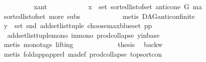 \begin{isabellebody}
\isanewline
\ \ \ \ \ \ \ \ \isamarkupfalse%
\ x{\isacharunderscore}{\kern0pt}ant\isanewline
\ \ \ \ \ \ \ \ \isamarkupfalse%
\ \isamarkupfalse%
\ {\isachardoublequoteopen}x\ {\isasymin}\ set\ {\isacharparenleft}{\kern0pt}sorted{\isacharunderscore}{\kern0pt}list{\isacharunderscore}{\kern0pt}of{\isacharunderscore}{\kern0pt}set\ {\isacharparenleft}{\kern0pt}anticone\ G\ ma{\isacharparenright}{\kern0pt}{\isacharparenright}{\kern0pt}{\isachardoublequoteclose}\ \isanewline
\ \ \ \ \ \ \ \ \ \ \isamarkupfalse%
\ sorted{\isacharunderscore}{\kern0pt}list{\isacharunderscore}{\kern0pt}of{\isacharunderscore}{\kern0pt}set{\isacharparenleft}{\kern0pt}{}{\isacharparenright}{\kern0pt}\ more\ subs\isanewline
\ \ \ \ \ \ \ \ \ \ \isamarkupfalse%
\ {\isacharparenleft}{\kern0pt}metis\ DAG{\isachardot}{\kern0pt}anticon{\isacharunderscore}{\kern0pt}finite{\isacharparenright}{\kern0pt}\ \isanewline
\ \ \ \ \ \ \ \ \isamarkupfalse%
\ \isamarkupfalse%
\ {\isachardoublequoteopen}y\ {\isasymin}\ set\ {\isacharparenleft}{\kern0pt}snd\ {\isacharparenleft}{\kern0pt}add{\isacharunderscore}{\kern0pt}set{\isacharunderscore}{\kern0pt}list{\isacharunderscore}{\kern0pt}tuple\ {\isacharparenleft}{\kern0pt}choose{\isacharunderscore}{\kern0pt}max{\isacharunderscore}{\kern0pt}blue{\isacharunderscore}{\kern0pt}set\ pp{\isacharparenright}{\kern0pt}{\isacharparenright}{\kern0pt}{\isacharparenright}{\kern0pt}{\isachardoublequoteclose}\isanewline
\ \ \ \ \ \ \ \ \ \ \isamarkupfalse%
\ \ add{\isacharunderscore}{\kern0pt}set{\isacharunderscore}{\kern0pt}list{\isacharunderscore}{\kern0pt}tuple{\isacharunderscore}{\kern0pt}mono\ in{\isacharunderscore}{\kern0pt}mono\ prod{\isachardot}{\kern0pt}collapse\ y{\isacharunderscore}{\kern0pt}in{\isacharunderscore}{\kern0pt}base\isanewline
\ \ \ \ \ \ \ \ \ \ \isamarkupfalse%
\ {\isacharparenleft}{\kern0pt}metis\ {\isacharparenleft}{\kern0pt}mono{\isacharunderscore}{\kern0pt}tags{\isacharcomma}{\kern0pt}\ lifting{\isacharparenright}{\kern0pt}{\isacharparenright}{\kern0pt}\ \isanewline
\ \ \ \ \ \ \ \ \isamarkupfalse%
\ \isamarkupfalse%
\ {\isacharquery}{\kern0pt}thesis\ \isamarkupfalse%
\ backw\isanewline
\ \ \ \ \ \ \ \ \ \ \isamarkupfalse%
\ {\isacharparenleft}{\kern0pt}metis\ fold{\isacharunderscore}{\kern0pt}app{\isacharunderscore}{\kern0pt}app{\isacharunderscore}{\kern0pt}rel\ ma{\isacharunderscore}{\kern0pt}def\ prod{\isachardot}{\kern0pt}collapse\ top{\isacharunderscore}{\kern0pt}sort{\isacharunderscore}{\kern0pt}con{\isacharparenright}{\kern0pt}\ \isanewline

\end{isabellebody}
